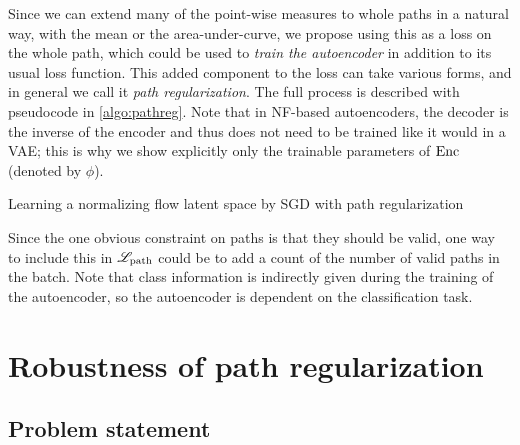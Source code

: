 \documentclass[../main.tex]{subfiles}
\begin{document}
Since we can extend many of the point-wise measures to whole paths in a natural way, \eg{} with the mean or the area-under-curve, we propose using this as a loss on the whole path, which could be used to \emph{train the autoencoder} in addition to its usual loss function.
This added component to the loss can take various forms, and in general we call it \emph{path regularization}. The full process is described with pseudocode in \autoref{algo:pathreg}.
Note that in NF-based autoencoders, the decoder is the inverse of the encoder and thus does not need to be trained like it would in a VAE; this is why we show explicitly only the trainable parameters of $\operatorname{Enc}$ (denoted by $\phi$).

\begin{algorithm}
\caption{Learning a normalizing flow latent space by SGD with path regularization}
\label{algo:pathreg}
\end{algorithm}

Since the one obvious constraint on paths is that they should be valid, one way to include this in $\mathscr{L}_\text{path}$ could be to add a count of the number of valid paths in the batch.
Note that class information is indirectly given during the training of the autoencoder, so the autoencoder is dependent on the classification task.

\section{Robustness of path regularization}

\subsection{Problem statement}
\end{document}
